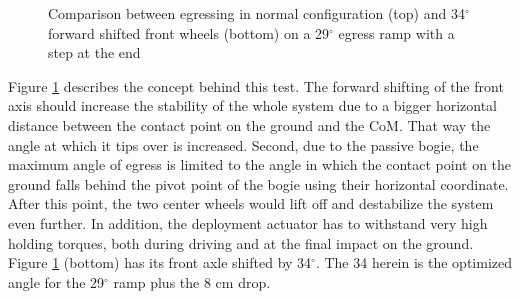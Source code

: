 \documentclass[a4paper,twocolumn]{esapub2005} %
\begin{document}
\begin{figure}[h]
    \centering
        \caption{Comparison between egressing in normal configuration (top) and
        34$^{\circ}$ forward shifted front wheels (bottom) on a 29$^{\circ}$
        egress ramp with a step at the end} \label{fig:egress29com}
\end{figure}

Figure \ref{fig:egress29com} describes the concept behind this test. The
forward shifting of the front axis should increase the stability of the
whole system due to a bigger horizontal distance between the contact point
on the ground and the CoM. That way the angle at which it tips over is
increased. Second, due to the passive bogie, the maximum angle of egress is
limited to the angle in which the contact point on the ground falls behind
the pivot point of the bogie using their horizontal coordinate. After this
point, the two center wheels would lift off and destabilize the system even
further. In addition, the deployment actuator has to withstand very high
holding torques, both during driving and at the final impact on the ground.
Figure \ref{fig:egress29com} (bottom) has its front axle shifted by
34$^\circ$. The 34 herein is the optimized angle for the 29$^\circ$ ramp
plus the 8 cm drop. 
\end{document}

